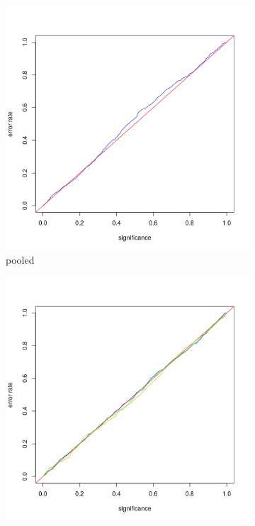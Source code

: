\documentclass[main]{subfiles}
\begin{document}
\begin{figure}[H]
\begin{center}
  \begin{subfigure}{.3\textwidth}
  \centering
  \includegraphics[scale=0.2]{images/pooledCalibrationPlot}
  \caption{pooled} \label{fig:pooledCalibrationPlot}
   \end{subfigure}    
  \begin{subfigure}{.3\textwidth}
  \centering
  \includegraphics[scale=0.2]{images/eqSourceInd}

\end{subfigure}
\end{center}
\end{figure}
\end{document}

